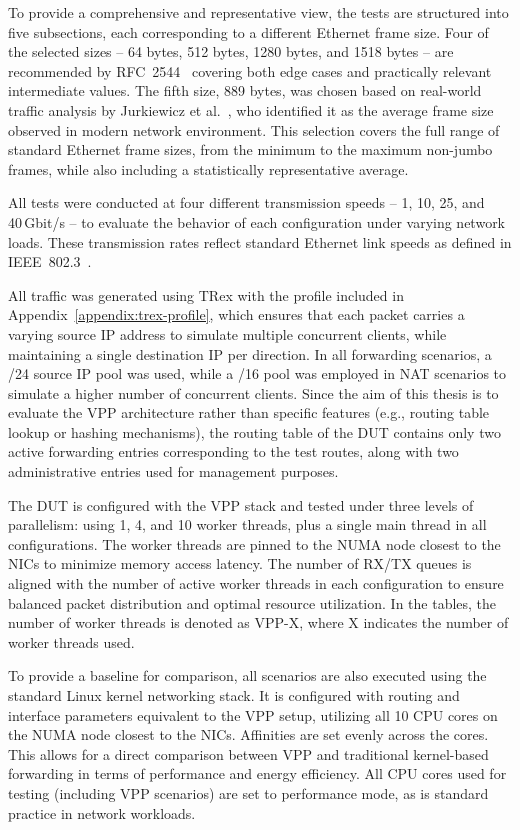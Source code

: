 To provide a comprehensive and representative view, the tests are structured into five subsections, each corresponding to a different Ethernet frame size. 
Four of the selected sizes -- 64 bytes, 512 bytes, 1280 bytes, and 1518 bytes -- are recommended by RFC~2544~\cite{rfc2544} 
covering both edge cases and practically relevant intermediate values. 
The fifth size, 889 bytes, was chosen based on real-world traffic analysis by Jurkiewicz et al.~\cite{JURKIEWICZ202115}, who identified it as the average frame size observed in modern network environment.
This selection covers the full range of standard Ethernet frame sizes, from the minimum to the maximum non-jumbo frames, 
while also including a statistically representative average.

All tests were conducted at four different transmission speeds -- 1, 10, 25, and 40 Gbit/s -- to evaluate the behavior of each configuration under varying network loads.  
These transmission rates reflect standard Ethernet link speeds as defined in IEEE~802.3~\cite{802.3}.

All traffic was generated using TRex with the profile included in Appendix~\ref{appendix:trex-profile},
which ensures that each packet carries a varying source IP address to simulate multiple concurrent clients, while maintaining a single destination IP per direction.
In all forwarding scenarios, a /24 source IP pool was used, while a /16 pool was employed in NAT scenarios to simulate a higher number of concurrent clients.
Since the aim of this thesis is to evaluate the VPP architecture rather than specific features (e.g., routing table lookup or hashing mechanisms),
the routing table of the DUT contains only two active forwarding entries corresponding to the test routes,
along with two administrative entries used for management purposes.

The DUT is configured with the VPP stack and tested under three levels of parallelism: using 1, 4, and 10 worker threads, plus a single main thread in all configurations.
The worker threads are pinned to the NUMA node closest to the NICs to minimize memory access latency.
The number of RX/TX queues is aligned with the number of active worker threads in each configuration to ensure balanced packet distribution and optimal resource utilization.
In the tables, the number of worker threads is denoted as VPP-X, where X indicates the number of worker threads used.

To provide a baseline for comparison, all scenarios are also executed using the standard Linux kernel networking stack.
It is configured with routing and interface parameters equivalent to the VPP setup, utilizing all 10 CPU cores on the NUMA node closest to the NICs.
Affinities are set evenly across the cores.
This allows for a direct comparison between VPP and traditional kernel-based forwarding in terms of performance and energy efficiency.
All CPU cores used for testing (including VPP scenarios) are set to performance mode, as is standard practice in network workloads.

